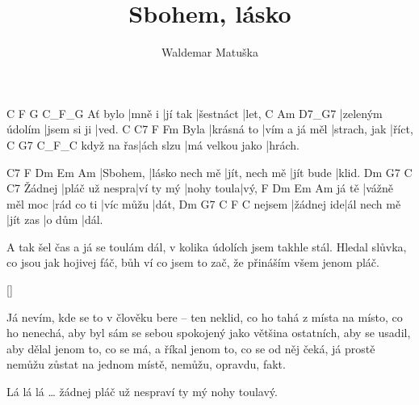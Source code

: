 \documentclass{song}
\title{Sbohem, lásko}
\author{Waldemar Matuška}
\begin{document}
\strophe
        C      F       G         C_F_G
Ať bylo |mně i |jí tak |šestnáct |let,
C               Am          D7_G7
|zeleným údolím |jsem si ji |ved.
     C          C7            F            Fm
Byla |krásná to |vím a já měl |strach, jak |říct,
           C         G7              C_F_C
když na řas|ách slzu |má velkou jako |hrách.
\endstrophe

C7       F              Dm            Em        Am
|Sbohem, |lásko nech mě |jít, nech mě |jít bude |klid.
       Dm             G7        C          C7
Žádnej |pláč už nespra|ví ty mý |nohy toula|vý,
      F              Dm         Em        Am
já tě |vážně měl moc |rád co ti |víc můžu |dát,
       Dm         G7          C        F      C
nejsem |žádnej ide|ál nech mě |jít zas |o dům |dál.
\endstrophe

\strophe*
A tak šel čas a já se toulám dál,
v kolika údolích jsem takhle stál.
Hledal slůvka, co jsou jak hojivej fáč,
bůh ví co jsem to zač, že přináším všem jenom pláč.
\endstrophe

\ref{}

\begin{recitative}
Já nevím, kde se to v člověku bere -- ten neklid,
co ho tahá z místa na místo, co ho nenechá,
aby byl sám se sebou spokojený jako většina ostatních,
aby se usadil, aby dělal jenom to, co se má,
a říkal jenom to, co se od něj čeká,
já prostě nemůžu zůstat na jednom místě, nemůžu, opravdu, fakt.
\end{recitative}

Lá lá lá \ldots
žádnej pláč už nespraví ty mý nohy toulavý.
\endstrophe
\end{document}
